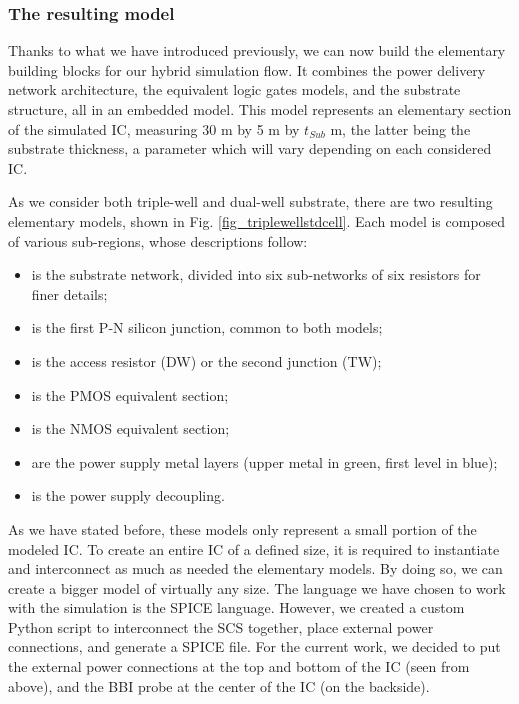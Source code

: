 	\subsubsection{The resulting model}
		Thanks to what we have introduced previously, we can now build the elementary building blocks for our hybrid simulation flow.
		It combines the power delivery network architecture, the equivalent logic gates models, and the substrate structure, all in an embedded model.
		This model represents an elementary section of the simulated IC, measuring 30 \textmu m by 5 \textmu m by $t_{Sub}$ \textmu m, the latter being the substrate thickness, a parameter which will vary depending on each considered IC.
		
		As we consider both triple-well and dual-well substrate, there are two resulting elementary models, shown in Fig. \ref{fig_triplewellstdcell}.
		Each model is composed of various sub-regions, whose descriptions follow:
		\begin{itemize}
			\item {} is the substrate network, divided into six sub-networks of six resistors for finer details;
			\item {} is the first P-N silicon junction, common to both models;
			\item {} is the access resistor (DW) or the second junction (TW);
			\item {} is the PMOS equivalent section;
			\item {} is the NMOS equivalent section;
			\item {} are the power supply metal layers (upper metal in green, first level in blue);
			\item {} is the power supply decoupling.
		\end{itemize}
		As we have stated before, these models only represent a small portion of the modeled IC.
		To create an entire IC of a defined size, it is required to instantiate and interconnect as much as needed the elementary models.
		By doing so, we can create a bigger model of virtually any size.
		The language we have chosen to work with the simulation is the SPICE language.
		However, we created a custom Python script to interconnect the SCS together, place external power connections, and generate a SPICE file.
		For the current work, we decided to put the external power connections at the top and bottom of the IC (seen from above), and the BBI probe at the center of the IC (on the backside).

